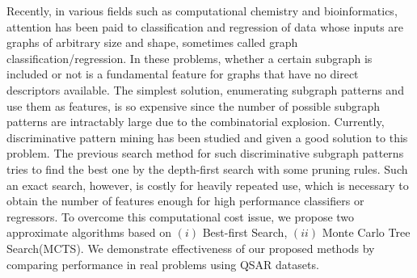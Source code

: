 Recently, in various fields such as computational chemistry and bioinformatics,
attention has been paid to classification and regression
of data whose inputs are graphs of arbitrary size and shape, 
sometimes called graph classification/regression.
In these problems,
whether a certain subgraph is included or not 
is a fundamental feature for graphs that have no direct descriptors available.
The simplest solution, 
enumerating subgraph patterns and use them as features, is so expensive 
since the number of possible subgraph patterns are intractably large 
due to the combinatorial explosion.
Currently, discriminative pattern mining has been studied and given a good solution to this problem.
The previous search method for such discriminative subgraph patterns 
tries to find the best one by the depth-first search with some pruning rules.
Such an exact search, however, is costly for heavily repeated use, 
which is necessary to obtain the number of features enough for high performance classifiers or regressors.
To overcome this computational cost issue, 
we propose two approximate algorithms based on 
$(i)$ Best-first Search, $(ii)$ Monte Carlo Tree Search(MCTS). 
We demonstrate effectiveness of our proposed methods by comparing performance 
in real problems using QSAR datasets.
